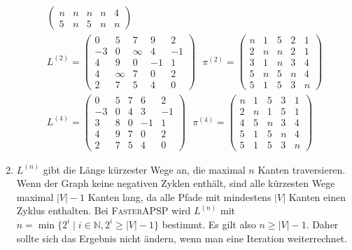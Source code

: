 \documentclass[11pt,a4paper]{article}
\begin{document}
\begin{loesung}
\begin{enumerate}
\begin{align*}
\begin{pmatrix}
                n & n & n & n & 4 \\
                5 & n & 5 & n & n
            \end{pmatrix}
            \\
            L^{(2)} = 
            \begin{pmatrix}
                0 & 5 & 7 & 9 & 2 \\
                -3 & 0 & \infty & 4 & -1 \\
                4 & 9 & 0 & -1 & 1 \\
                4 & \infty & 7 & 0 & 2 \\
                2 & 7 & 5 & 4 & 0
            \end{pmatrix}
            \,\,\,\,
            \pi^{(2)} =
            \begin{pmatrix}
                n & 1 & 5 & 2 & 1 \\
                2 & n & n & 2 & 1 \\
                3 & 1 & n & 3 & 4 \\
                5 & n & 5 & n & 4 \\
                5 & 1 & 5 & 3 & n
            \end{pmatrix}
            \\
            L^{(4)} =
            \begin{pmatrix}
                0 & 5 & 7 & 6 & 2 \\
                -3 & 0 & 4 & 3 & -1 \\
                3 & 8 & 0 & -1 & 1 \\
                4 & 9 & 7 & 0 & 2 \\
                2 & 7 & 5 & 4 & 0
            \end{pmatrix}
            \,\,\,\,
            \pi^{(4)} =
            \begin{pmatrix}
                n & 1 & 5 & 3 & 1 \\
                2 & n & 1 & 5 & 1 \\
                4 & 5 & n & 3 & 4 \\
                5 & 1 & 5 & n & 4 \\
                5 & 1 & 5 & 3 & n
            \end{pmatrix}
        \end{align*}
        \item
        $L^{(n)}$ gibt die Länge kürzester Wege an, die maximal $n$ Kanten traversieren.
        Wenn der Graph keine negativen Zyklen enthält, sind alle kürzesten Wege maximal $|V| - 1$ Kanten lang, da alle Pfade mit mindestens $|V|$ Kanten einen Zyklus enthalten.
        Bei \textsc{FasterAPSP} wird $L^{(n)}$ mit $n = \min\{2^i \mid i \in \mathbb{N}, 2^i \geq |V| - 1\}$ bestimmt.
        Es gilt also $n \geq |V| - 1$.
        Daher sollte sich das Ergebnis nicht ändern, wenn man eine Iteration weiterrechnet.
        

\end{enumerate}
\end{loesung}
\end{document}
